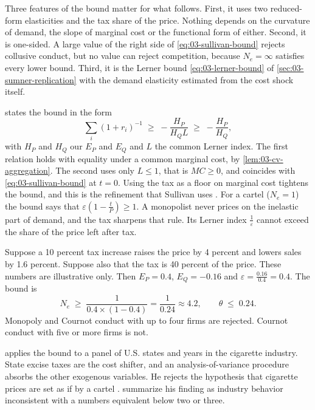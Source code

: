 Three features of the bound matter for what follows. First, it uses two reduced-form elasticities and the
tax share of the price. Nothing depends on the curvature of demand, the slope of marginal cost or the
functional form of either. Second, it is one-sided. A large value of the right side of
\eqref{eq:03-sullivan-bound} rejects collusive conduct, but no value can reject competition, because $N_e =
\infty$ satisfies every lower bound. Third, it is the Lerner bound \eqref{eq:03-lerner-bound} of
\cref{sec:03-sumner-replication} with the demand elasticity estimated from the cost shock itself.

\citet[eq.~25]{Bresnahan1989} states the bound in the form
\begin{equation*}
  \sum_i (1 + r_i)^{-1} \;\ge\; -\frac{H_P}{H_Q L} \;\ge\; -\frac{H_P}{H_Q},
\end{equation*}
with $H_P$ and $H_Q$ our $E_P$ and $E_Q$ and $L$ the common Lerner index. The first relation holds with
equality under a common marginal cost, by \cref{lem:03-cv-aggregation}. The second uses only $L \le 1$, that
is $MC \ge 0$, and coincides with \eqref{eq:03-sullivan-bound} at $t = 0$. Using the tax as a floor on
marginal cost tightens the bound, and this is the refinement that Sullivan uses
\citep[p.~1038]{Bresnahan1989}. For a cartel ($N_e = 1$) the bound says that $\varepsilon(1 - \frac{t}{P})
\ge 1$. A monopolist never prices on the inelastic part of demand, and the tax sharpens that rule. Its Lerner
index $\frac{1}{\varepsilon}$ cannot exceed the share of the price left after tax.

\begin{example}\label{ex:03-sullivan}
Suppose a 10 percent tax increase raises the price by 4 percent and lowers sales by 1.6 percent. Suppose
also that the tax is 40 percent of the price. These numbers are illustrative only. Then $E_P = 0.4$, $E_Q =
-0.16$ and $\varepsilon = \frac{0.16}{0.4} = 0.4$. The bound is
\begin{equation*}
  N_e \;\ge\; \frac{1}{0.4 \times (1 - 0.4)} = \frac{1}{0.24} \approx 4.2,
  \qquad \theta \;\le\; 0.24 .
\end{equation*}
Monopoly and Cournot conduct with up to four firms are rejected. Cournot conduct with five or more firms
is not.
\end{example}

\citet{Sullivan1985} applies the bound to a panel of U.S. states and years in the cigarette industry. State
excise taxes are the cost shifter, and an analysis-of-variance procedure absorbs the other exogenous
variables. He rejects the hypothesis that cigarette prices are set as if by a cartel
\citep[p.~1038]{Bresnahan1989}. \citet[p.~496]{AshenfelterSullivan1987} summarize his finding as industry
behavior inconsistent with a numbers equivalent below two or three.

